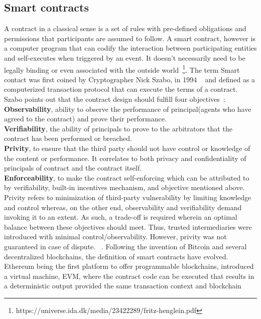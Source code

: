 \subsection{Smart contracts}
A contract in a classical sense is a set of rules with pre-defined obligations
and permissions that participants are assumed to follow. 
A smart contract, however is a computer program that can codify the
interaction between participating entities and self-executes when triggered by
an event. It doesn't necessarily need to be legally binding or even associated
with the outside world~\footnote{https://universe.ida.dk/media/23422289/fritz-henglein.pdf}.
The term Smart contact was first coined by Cryptographer Nick Szabo, in 1994
~\cite{SzaboSmart1994} and defined as a computerized transaction protocol that
can execute the terms of a contract. Szabo points out that the contract
design should fulfill four objectives~\cite{szabo1996smart}: \\
\textbf{Observability}, ability to observe the performance of principal(agents
who have agreed to the contract) and prove their performance.\\
\textbf{Verifiability}, the ability of principals to prove to the arbitrators
that the contract has been performed or breached. \\ 
\textbf{Privity}, to ensure that the third party should not have control or
knowledge of the content or performance. It correlates to both privacy and
confidentiality of principals of contract and the contract itself. \\
\textbf{Enforceability}, to make the contract self-enforcing which can be
attributed to by verifiability, built-in incentives mechanism, and objective
mentioned above. \\
Privity refers to minimization of third-party vulnerability by limiting
knowledge and control whereas, on the other end, observability and
verifiability demand invoking it to an extent. As such, a trade-off is
required wherein an optimal balance between these objectives should meet. Thus,
trusted intermediaries were introduced with minimal control/observability.
However, privity was not guaranteed in case of dispute. 
~\cite{szabo1997formalizing}.
Following the invention of Bitcoin and several decentralized blockchains, the
definition of smart contracts have evolved. Ethereum being the first platform
to offer programmable blockchains, introduced a virtual machine, EVM, where the
contract code can be executed that results in a deterministic output provided
the same transaction context and blockchain

